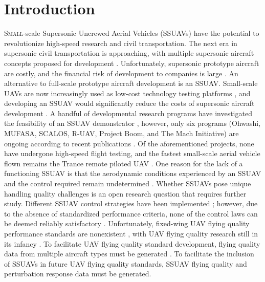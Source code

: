 \section{Introduction}
\lettrine{S}{mall}-scale Supersonic Uncrewed Aerial Vehicles (SSUAVs) have the potential to revolutionize high-speed research and civil transportation. 
The next era in supersonic civil transportation is approaching, with multiple supersonic aircraft concepts proposed for development \cite{A248Sun2017}. 
Unfortunately, supersonic prototype aircraft are costly, and the financial risk of development to companies is large \cite{NewsAerionFailureForbes}. %
An alternative to full-scale prototype aircraft development is an SSUAV. 
Small-scale UAVs are now increasingly used as low-cost technology testing platforms \cite{A319Sobron2021}, and developing an SSUAV would significantly reduce the costs of supersonic aircraft development \cite{A244Eckstrom1975}. 
A handful of developmental research programs have investigated the feasibility of an SSUAV demonstrator \cite{mizobata2005development, A297Barbosa2014, A19Walter2012, A256Jacob2021, MachInitiative,A381Durante2022, A355Nelson2022}, however, only six programs (Ohwashi, MUFASA, SCALOS, R-UAV, Project Boom, and The Mach Initiative) are ongoing according to recent publications \cite{A381Durante2022, A256Jacob2021, A355Nelson2022, MachInitiative,newOowashi}. 
Of the aforementioned projects, none have undergone high-speed flight testing, and the fastest small-scale aerial vehicle flown remains the Trance remote piloted UAV \cite{Trance_2017}. 
One reason for the lack of a functioning SSUAV is that the aerodynamic conditions experienced by an SSUAV and the control required remain undetermined \cite{A355Nelson2022}. 
Whether SSUAVs pose unique handling quality challenges is an open research question that requires further study. 
Different SSUAV control strategies have been implemented \cite{A15Burnashev2019a, A103Langston2016, A279UEBA2021, D20Wienke2011}; however, due to the absence of standardized performance criteria, none of the control laws can be deemed reliably satisfactory \cite{Text2015AircraftControlAndSimulation}. 
Unfortunately, fixed-wing UAV flying quality performance standards are nonexistent \cite{A304Klyde2020}, with UAV flying quality research still in its infancy \cite{D37Cotting2010, A304Klyde2020}. 
To facilitate UAV flying quality standard development, flying quality data from multiple aircraft types must be generated \cite{A390Greene2014, A387Holmberg2008}. 
To facilitate the inclusion of SSUAVs in future UAV flying quality standards, SSUAV flying quality and perturbation response data must be generated.